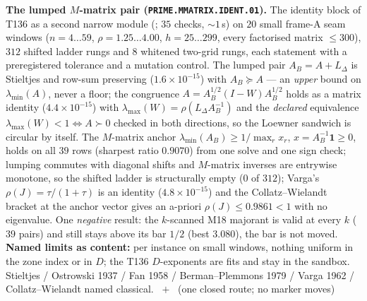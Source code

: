 \par\smallskip\noindent\textbf{The lumped $M$-matrix pair
(\texttt{PRIME.MMATRIX.IDENT.01}).}
The identity block of T136 as a second narrow module
(; $35$ checks, ${\sim}1$\,s) on $20$
small frame-A seam windows ($n=4\ldots59$, $\rho=1.25\ldots4.00$,
$h=25\ldots299$, every factorised matrix $\le300$), $312$ shifted ladder rungs
and $8$ whitened two-grid rungs, each statement with a preregistered tolerance
and a mutation control. The lumped pair $A_B=A+L_\Delta$ is Stieltjes and
row-sum preserving ($1.6\times10^{-15}$) with $A_B\succeq A$ --- an \emph{upper}
bound on $\lambda_{\min}(A)$, never a floor; the congruence
$A=A_B^{1/2}(I-W)A_B^{1/2}$ holds as a matrix identity ($4.4\times10^{-15}$) with
$\lambda_{\max}(W)=\rho(L_\Delta A_B^{-1})$ and the \emph{declared} equivalence
$\lambda_{\max}(W)<1\iff A\succ0$ checked in both directions, so the Loewner
sandwich is circular by itself. The $M$-matrix anchor
$\lambda_{\min}(A_B)\ge1/\max_r x_r$, $x=A_B^{-1}\mathbf 1\ge0$, holds on all
$39$ rows (sharpest ratio $0.9070$) from one solve and one sign check; lumping
commutes with diagonal shifts and $M$-matrix inverses are entrywise monotone, so
the shifted ladder is structurally empty ($0$ of $312$); Varga's
$\rho(J)=\tau/(1+\tau)$ is an identity ($4.8\times10^{-15}$) and the
Collatz--Wielandt bracket at the anchor vector gives an a-priori
$\rho(J)\le0.9861<1$ with no eigenvalue. One \emph{negative} result: the
$k$-scanned M18 majorant is valid at every $k$ ($39$ pairs) and still stays above
its bar $1/2$ (best $3.080$), the bar is not moved.
\textbf{Named limits as content:} per instance on small windows, nothing uniform
in the zone index or in $D$; the T136 $D$-exponents are fits and stay in the
sandbox. Stieltjes / Ostrowski 1937 / Fan 1958 / Berman--Plemmons 1979 /
Varga 1962 / Collatz--Wielandt named classical.
\mE\ $+$ \mX\ (one closed route; no marker moves)
\par\smallskip


